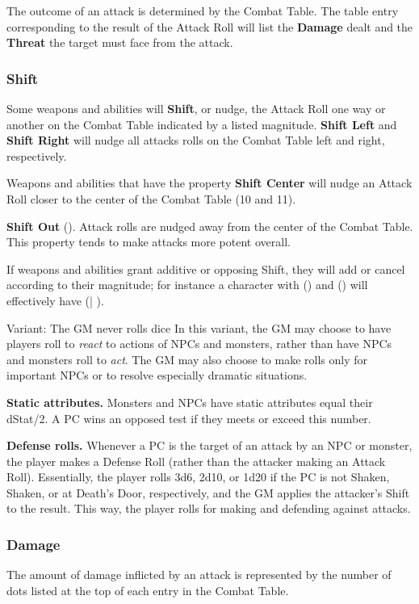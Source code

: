 \documentclass[10pt,twoside,twocolumn,openany]{book}
\begin{document}
The outcome of an attack is determined by the Combat Table. The table entry corresponding to the result of the Attack Roll will list the \textbf{Damage} dealt and the \textbf{Threat} the target must face from the attack.

\subsubsection{Shift}
Some weapons and abilities will \textbf{Shift}, or nudge, the Attack Roll one way or another on the Combat Table indicated by a listed magnitude. \textbf{Shift Left} and \textbf{Shift Right} will nudge all attacks rolls on the Combat Table left and right, respectively.

Weapons and abilities that have the property \textbf{Shift Center} will nudge an Attack Roll closer to the center of the Combat Table (10 and 11).

\textbf{Shift Out} (\shiftout). Attack rolls are nudged away from the center of the Combat Table. This property tends to make attacks more potent overall.

If weapons and abilities grant additive or opposing Shift, they will add or cancel according to their magnitude; for instance a character with (\shiftout) and (\shiftleft\shiftleft) will effectively have (\shiftleft\shiftleft\shiftleft | \shiftleft).

\begin{commentbox}{Variant: The GM never rolls dice}
In this variant, the GM may choose to have players roll to \textit{react} to actions of NPCs and monsters, rather than have NPCs and monsters roll to \textit{act}. The GM may also choose to make rolls only for important NPCs or to resolve especially dramatic situations.
\par \textbf{Static attributes.} Monsters and NPCs have static attributes equal their dStat/2. A PC wins an opposed test if they meets or exceed this number.
\par \textbf{Defense rolls.} Whenever a PC is the target of an attack by an NPC or monster, the player makes a Defense Roll (rather than the attacker making an Attack Roll). Essentially, the player rolls 3d6, 2d10, or 1d20 if the PC is not Shaken, Shaken, or at Death's Door, respectively, and the GM applies the attacker's Shift to the result. This way, the player rolls for making and defending against attacks.
\end{commentbox}

\subsubsection{Damage}
The amount of damage inflicted by an attack is represented by the number of dots listed at the top of each entry in the Combat Table.
\end{document}
